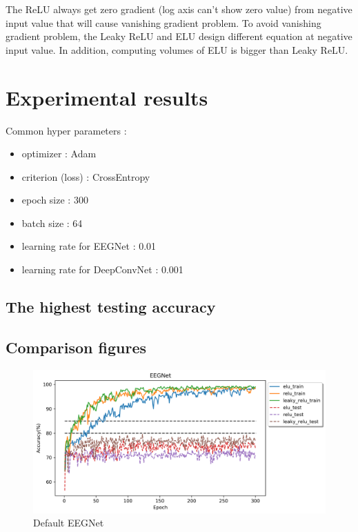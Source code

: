 \documentclass[12pt]{article}
\begin{document}
The ReLU always get zero gradient (log axis can't show zero value) from negative input value that will cause vanishing gradient problem. To avoid vanishing gradient problem, the Leaky ReLU and ELU design different equation at negative input value. In addition, computing volumes of ELU is bigger than Leaky ReLU. 

\section{Experimental results}

Common hyper parameters : 
\begin{itemize}
\item optimizer : Adam
\item criterion (loss) : CrossEntropy
\item epoch size : 300
\item batch size : 64
\item learning rate for EEGNet : 0.01
\item learning rate for DeepConvNet : 0.001
\end{itemize}

\subsection{The highest testing accuracy}


\subsection{Comparison figures}

\begin{figure}[H]
\centering
\includegraphics[width=\linewidth]{Images/EEGNet.png}
\caption{Default EEGNet}
\end{figure}
\end{document}
